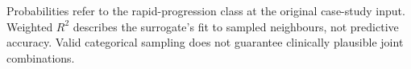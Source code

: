 \begin{table}[ht!]
\centering\small
\caption[Local fidelity of categorical-aware LIME]{Local fidelity of categorical-aware LIME}
\label{tab:review_s1_lime_fidelity}
\setlength{\tabcolsep}{4pt}
\par\smallskip
\begin{minipage}{0.98\linewidth}\footnotesize
Probabilities refer to the rapid-progression class at the original case-study input. Weighted $R^2$ describes the surrogate's fit to sampled neighbours, not predictive accuracy. Valid categorical sampling does not guarantee clinically plausible joint combinations.
\end{minipage}
\end{table}
